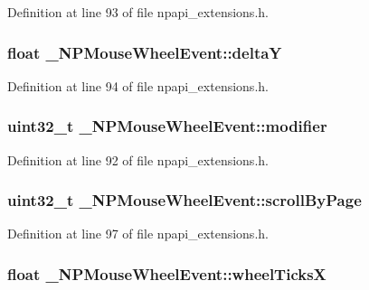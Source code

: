 Definition at line 93 of file npapi\_\-extensions.h.

\hypertarget{struct___n_p_mouse_wheel_event_a57c3e96087783814df9687807b474b2b}{
\subsubsection[{deltaY}]{\setlength{\rightskip}{0pt plus 5cm}float {\bf \_\-NPMouseWheelEvent::deltaY}}}
\label{struct___n_p_mouse_wheel_event_a57c3e96087783814df9687807b474b2b}


Definition at line 94 of file npapi\_\-extensions.h.

\hypertarget{struct___n_p_mouse_wheel_event_aebfe75b9fd698e72eded59a431cb6976}{
\subsubsection[{modifier}]{\setlength{\rightskip}{0pt plus 5cm}uint32\_\-t {\bf \_\-NPMouseWheelEvent::modifier}}}
\label{struct___n_p_mouse_wheel_event_aebfe75b9fd698e72eded59a431cb6976}


Definition at line 92 of file npapi\_\-extensions.h.

\hypertarget{struct___n_p_mouse_wheel_event_aa790a7baeea6d6a73ae416855b037875}{
\subsubsection[{scrollByPage}]{\setlength{\rightskip}{0pt plus 5cm}uint32\_\-t {\bf \_\-NPMouseWheelEvent::scrollByPage}}}
\label{struct___n_p_mouse_wheel_event_aa790a7baeea6d6a73ae416855b037875}


Definition at line 97 of file npapi\_\-extensions.h.

\hypertarget{struct___n_p_mouse_wheel_event_af31de66fa204cc6541fafca99055218c}{
\subsubsection[{wheelTicksX}]{\setlength{\rightskip}{0pt plus 5cm}float {\bf \_\-NPMouseWheelEvent::wheelTicksX}}}
\label{struct___n_p_mouse_wheel_event_af31de66fa204cc6541fafca99055218c}



